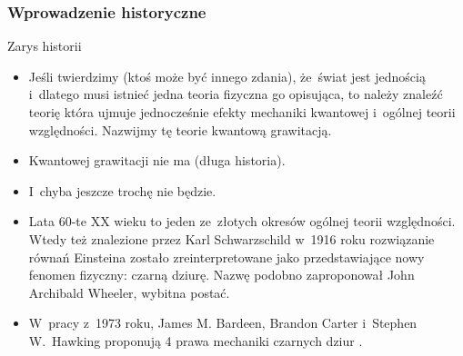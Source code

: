 \documentclass{beamer}  %
\begin{document}
\begin{frame}
  \frametitle{Wprowadzenie historyczne}


  \begin{block}{Zarys historii}
    \begin{itemize}
    \item Jeśli twierdzimy (ktoś może być innego zdania), że~świat
      jest jednością i~dlatego musi istnieć jedna teoria fizyczna go
      opisująca, to należy znaleźć teorię która ujmuje jednocześnie
      efekty mechaniki kwantowej i~ogólnej teorii względności.
      Nazwijmy tę teorie kwantową grawitacją.
    \item Kwantowej grawitacji nie ma (długa historia).
    \item I~chyba jeszcze trochę nie będzie.
    \item Lata 60-te XX wieku to jeden ze~złotych okresów ogólnej
      teorii względności. Wtedy też znalezione przez Karl
      Schwarzschild w~1916 roku rozwiązanie równań Einsteina zostało
      zreinterpretowane jako przedstawiające nowy fenomen fizyczny:
      czarną dziurę. Nazwę podobno zaproponował John Archibald
      Wheeler, wybitna postać.
    \item W~pracy z~1973 roku, James M. Bardeen, Brandon Carter
      i~Stephen W.~Hawking proponują 4 prawa mechaniki czarnych dziur
      \cite{BardeenCarterHawkingFourLawsOfBHMechanics1973}.
    \end{itemize}
  \end{block}

\end{frame}
\end{document}
